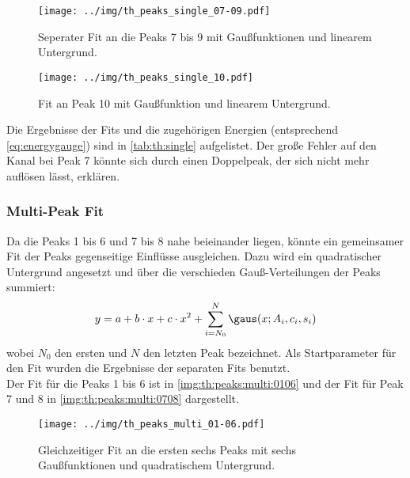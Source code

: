 \begin{figure}[H]
\begin{center}
  \texttt{[image: ../img/th\_peaks\_single\_07-09.pdf]}
  \caption{Seperater Fit an die Peaks 7 bis 9 mit Gaußfunktionen und linearem Untergrund.}
  \label{img:th:peaks:single:0709}
\end{center}
\end{figure}

\begin{figure}[H]
\begin{center}
  \texttt{[image: ../img/th\_peaks\_single\_10.pdf]}
  \caption{Fit an Peak 10 mit Gaußfunktion und linearem Untergrund.}
  \label{img:th:peaks:single:10}
\end{center}
\end{figure}

Die Ergebnisse der Fits und die zugehörigen Energien (entsprechend \autoref{eq:energygauge}) sind in \autoref{tab:th:single} aufgelistet.
Der große Fehler auf den Kanal bei Peak 7 könnte sich durch einen Doppelpeak, der sich nicht mehr auflösen lässt, erklären.


\subsubsection{Multi-Peak Fit} %
Da die Peaks 1 bis 6 und 7 bis 8 nahe beieinander liegen, könnte ein gemeinsamer Fit der Peaks gegenseitige Einflüsse ausgleichen.
Dazu wird ein quadratischer Untergrund angesetzt und über die verschieden Gauß-Verteilungen der Peaks summiert:
\begin{equation}
  y = a + b\cdot x + c\cdot x^2 + \sum_{i=N_0}^{N} \gaus(x; A_i, c_i, s_i)
\end{equation}
wobei $N_0$ den ersten und $N$ den letzten Peak bezeichnet. Als Startparameter für den Fit wurden die Ergebnisse der separaten Fits benutzt.\\
Der Fit für die Peaks 1 bis 6 ist in \autoref{img:th:peaks:multi:0106} und der Fit für Peak 7 und 8 in 
\autoref{img:th:peaks:multi:0708} dargestellt.
\begin{figure}[H]
\begin{center}
  \texttt{[image: ../img/th\_peaks\_multi\_01-06.pdf]}
  \caption{Gleichzeitiger Fit an die ersten sechs Peaks mit sechs Gaußfunktionen und quadratischem Untergrund.}
  \label{img:th:peaks:multi:0106}
\end{center}
\end{figure}

